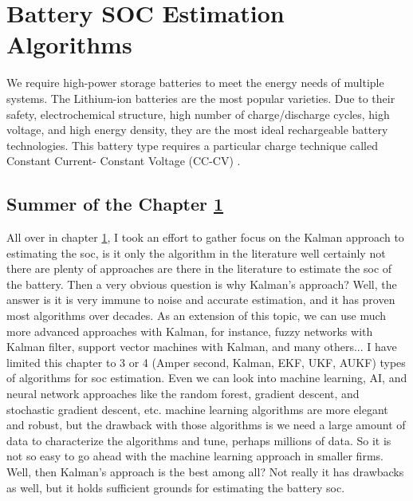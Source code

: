 \chapter{Battery SOC Estimation Algorithms}\label{ch:Battery_SOC_Estimation_Algorithms}
We require high-power storage batteries to meet the energy needs of multiple systems. The Lithium-ion batteries are the most popular varieties. Due to their safety, electrochemical structure, high number of charge/discharge cycles, high voltage, and high energy density, they are the most ideal rechargeable battery technologies. This battery type requires a particular charge technique called Constant Current- Constant Voltage (CC-CV) \cite{Coulomb_Counting_SOC_Estimation}.




\section{Summer of the Chapter \ref{ch:Battery_SOC_Estimation_Algorithms}}
All over in chapter \ref{ch:Battery_SOC_Estimation_Algorithms}, I took an effort to gather focus on the Kalman approach to estimating the soc, is it only the algorithm in the literature well certainly not there are plenty of approaches are there in the literature to estimate the soc of the battery. Then a very obvious question is why Kalman's approach? Well, the answer is it is very immune to noise and accurate estimation, and it has proven most algorithms over decades. As an extension of this topic, we can use much more advanced approaches with Kalman, for instance, fuzzy networks with Kalman filter, support vector machines with Kalman, and many others... I have limited this chapter to 3 or 4 (Amper second, Kalman, EKF, UKF, AUKF) types of algorithms for soc estimation. Even we can look into machine learning, AI, and neural network approaches like the random forest, gradient descent, and stochastic gradient descent, etc. machine learning algorithms are more elegant and robust, but the drawback with those algorithms is we need a large amount of data to characterize the algorithms and tune, perhaps millions of data.  So it is not so easy to go ahead with the machine learning approach in smaller firms. Well, then Kalman's approach is the best among all? Not really it has drawbacks as well, but it holds sufficient grounds for estimating the battery soc.